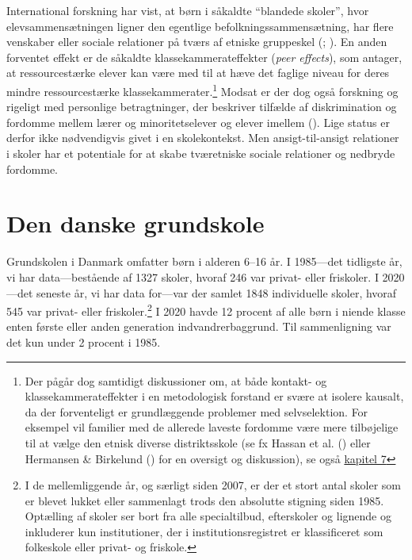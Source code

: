 \documentclass[
]{book}
\begin{document}
International forskning har vist, at børn i såkaldte ``blandede skoler'', hvor elevsammensætningen ligner den egentlige befolkningssammensætning, har flere venskaber eller sociale relationer på tværs af etniske gruppeskel (; ). En anden forventet effekt er de såkaldte klassekammerateffekter (\emph{peer effects}), som antager, at ressourcestærke elever kan være med til at hæve det faglige niveau for deres mindre ressourcestærke klassekammerater.\footnote{Der pågår dog samtidigt diskussioner om, at både kontakt- og klassekammerateffekter i en metodologisk forstand er svære at isolere kausalt, da der forventeligt er grundlæggende problemer med selvselektion. For eksempel vil familier med de allerede laveste fordomme være mere tilbøjelige til at vælge den etnisk diverse distriktsskole (se fx Hassan et al. () eller Hermansen \& Birkelund () for en oversigt og diskussion), se også \hyperref[kap7]{kapitel 7}} Modsat er der dog også forskning og rigeligt med personlige betragtninger, der beskriver tilfælde af diskrimination og fordomme mellem lærer og minoritetselever og elever imellem (). Lige status er derfor ikke nødvendigvis givet i en skolekontekst. Men ansigt-til-ansigt relationer i skoler har et potentiale for at skabe tværetniske sociale relationer og nedbryde fordomme.

\section{Den danske grundskole}\label{den-danske-grundskole}

Grundskolen i Danmark omfatter børn i alderen 6--16 år. I 1985---det tidligste år, vi har data---bestående af 1327 skoler, hvoraf 246 var privat- eller friskoler. I 2020---det seneste år, vi har data for---var der samlet 1848 individuelle skoler, hvoraf 545 var privat- eller friskoler.\footnote{I de mellemliggende år, og særligt siden 2007, er der et stort antal skoler som er blevet lukket eller sammenlagt trods den absolutte stigning siden 1985. Optælling af skoler ser bort fra alle specialtilbud, efterskoler og lignende og inkluderer kun institutioner, der i institutionsregistret er klassificeret som folkeskole eller privat- og friskole.} I 2020 havde 12 procent af alle børn i niende klasse enten første eller anden generation indvandrerbaggrund. Til sammenligning var det kun under 2 procent i 1985.
\end{document}
